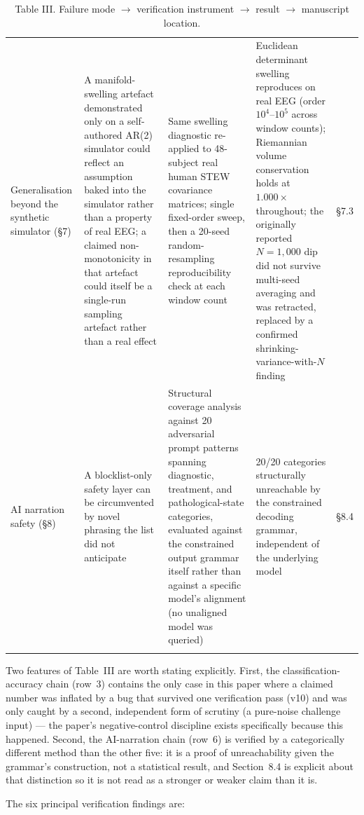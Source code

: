 \documentclass[11pt]{article}
\begin{document}
{\begin{longtable}{p{}p{}p{}p{}p{}}
Generalisation beyond the synthetic simulator (\S7) & A manifold-swelling artefact demonstrated only on a self-authored AR(2) simulator could reflect an assumption baked into the simulator rather than a property of real EEG; a claimed non-monotonicity in that artefact could itself be a single-run sampling artefact rather than a real effect & Same swelling diagnostic re-applied to 48-subject real human STEW covariance matrices; single fixed-order sweep, then a 20-seed random-resampling reproducibility check at each window count & Euclidean determinant swelling reproduces on real EEG (order $10^4$--$10^5$ across window counts); Riemannian volume conservation holds at $1.000\times$ throughout; the originally reported $N=1{,}000$ dip did not survive multi-seed averaging and was retracted, replaced by a confirmed shrinking-variance-with-$N$ finding & \S7.3 \\
AI narration safety (\S8) & A blocklist-only safety layer can be circumvented by novel phrasing the list did not anticipate & Structural coverage analysis against 20 adversarial prompt patterns spanning diagnostic, treatment, and pathological-state categories, evaluated against the constrained output grammar itself rather than against a specific model's alignment (no unaligned model was queried) & 20/20 categories structurally unreachable by the constrained decoding grammar, independent of the underlying model & \S8.4 \\
\bottomrule
\caption{Table III. Failure mode $\to$ verification instrument $\to$ result $\to$ manuscript location.}
\end{longtable}
}

Two features of Table~III are worth stating explicitly. First, the classification-accuracy chain (row~3) contains the only case in this paper where a claimed number was inflated by a bug that survived one verification pass (v10) and was only caught by a second, independent form of scrutiny (a pure-noise challenge input) --- the paper's negative-control discipline exists specifically because this happened. Second, the AI-narration chain (row~6) is verified by a categorically different method than the other five: it is a proof of unreachability given the grammar's construction, not a statistical result, and Section~8.4 is explicit about that distinction so it is not read as a stronger or weaker claim than it is.

The six principal verification findings are:
\end{document}
